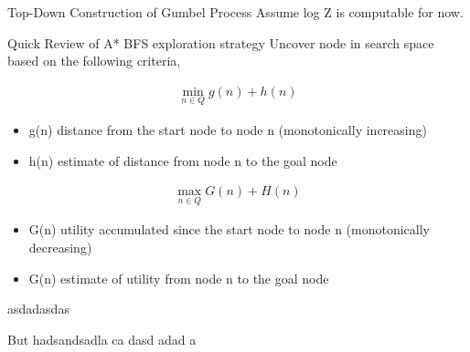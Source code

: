 \begin{frame}{Top-Down Construction of Gumbel Process}
  Assume log Z is computable for now.
\end{frame}
\begin{frame}{Quick Review of A*}
  BFS exploration strategy
  Uncover node in search space based on the following criteria,
  \begin{overprint}
    \begin{align*}
      \min_{n \in Q} g(n) + h(n)
    \end{align*}

    \begin{itemize}
    \item g(n) distance from the start node to node n (monotonically increasing)
    \item h(n) estimate of distance from node n to the goal node
    \end{itemize}
    \begin{align*}
      \max_{n \in Q} G(n) + H(n)
    \end{align*}

    \begin{itemize}
    \item G(n) utility accumulated since the start node to node n (monotonically decreasing)
    \item G(n) estimate of utility from node n to the goal node
    \end{itemize}
    
  \end{overprint}
\end{frame}

\begin{frame}
   {asdadasdas}

      {
        But
        hadsandsadla ca
        dasd
        adad
        a}
\end{frame}


